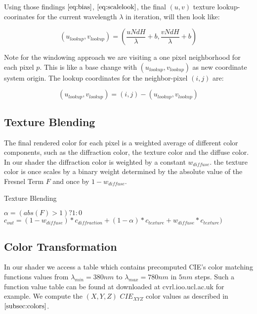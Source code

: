 Using those findings $\ref{eq:bias}$, $\ref{eq:scalelook}$, the final $(u,v)$ texture lookup-coorinates for the current wavelength $\lambda$ in iteration, will then look like:

\begin{equation}
  (u_{lookup}, v_{lookup}) = \left( \frac{u N dH}{\lambda} + b, \frac{v N dH}{\lambda} + b \right)
\label{eq:ublookup}
\end{equation}  

Note for the windowing approach we are visiting a one pixel neighborhood for each pixel $p$. 
This is like a base change with $(u_{lookup}, v_{lookup})$ as new coordinate system origin. The lookup coordinates for the neighbor-pixel $(i,j)$ are:

\begin{equation}
  (u_{lookup}, v_{lookup}) = (i,j)-(u_{lookup}, v_{lookup})
\label{eq:gaussianwindowlook}
\end{equation}

\subsection{Texture Blending}
The final rendered color for each pixel is a weighted average of different color components, such as the diffraction color, the texture color and the diffuse color. In our shader the diffraction color is weighted by a constant $w_{diffuse}$. the texture color is once scales by a binary weight determined by the absolute value of the Fresnel Term $F$ and once by $1-w_{diffuse}$. 

\begin{algorithm}[H]
  \caption{Texture Blending}
  \begin{algorithmic}
    \State $\alpha = (abs(F) > 1) ? 1 : 0$
    \State $c_{out} =(1-w_{diffuse})*c_{diffraction} + (1-\alpha)*c_{texture} + w_{diffuse}*c_{texture})$
  \end{algorithmic}
\end{algorithm}

\subsection{Color Transformation}
\label{subsec:colortransformations}

In our shader we access a table which contains precomputed CIE's color matching functions values from $\lambda_{min} = 380 nm$ to $\lambda_{max} = 780 nm$ in $5 nm$ steps. Such a function value table can be found at downloaded at cvrl.ioo.ucl.ac.uk for example. We compute the $(X,Y,Z)$ $CIE_{XYZ}$ color values as described in $\ref{subsec:colors}$. 



